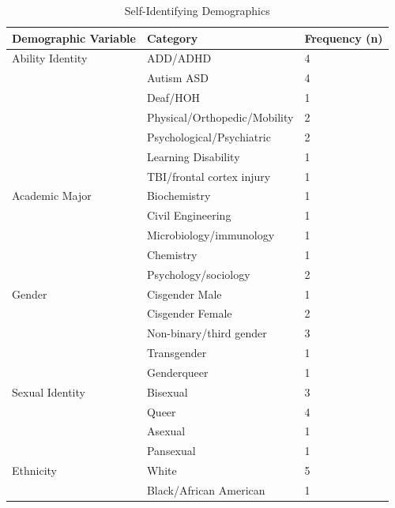 \documentclass{sig-alternate} %
\begin{document}
\begin{large}
\begin{table}[ht]
\caption{Self-Identifying Demographics\protect\footnotemark}
\begin{tabular}{|l|l|l|}
\hline
\textbf{Demographic Variable} & \textbf{Category} & \textbf{Frequency (n)} \\ \hline
Ability Identity & ADD/ADHD & 4 \\
 & Autism ASD & 4 \\
 & Deaf/HOH & 1 \\
 & Physical/Orthopedic/Mobility & 2 \\
 & Psychological/Psychiatric & 2 \\
 & Learning Disability & 1 \\
 & TBI/frontal cortex injury & 1 \\ \hline
Academic Major & Biochemistry & 1 \\
 & Civil Engineering & 1 \\
 & Microbiology/immunology & 1 \\
 & Chemistry & 1 \\
 & Psychology/sociology & 2 \\ \hline
Gender & Cisgender Male & 1 \\
 & Cisgender Female & 2 \\
 & Non-binary/third gender & 3 \\
 & Transgender & 1 \\
 & Genderqueer & 1 \\ \hline
Sexual Identity & Bisexual & 3 \\
 & Queer & 4 \\
 & Asexual & 1 \\
 & Pansexual & 1 \\ \hline
Ethnicity & White & 5 \\
 & Black/African American & 1\\ \hline
\end{tabular}
\end{table}


\end{large}
\end{document}
